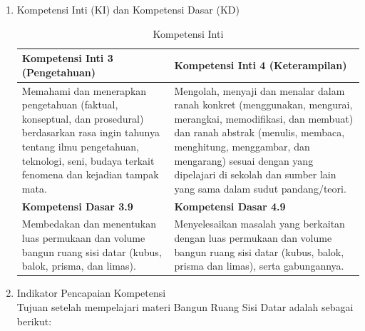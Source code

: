 \documentclass[12pt]{article}
\begin{document}
\begin{enumerate}[leftmargin=1cm, label=\arabic*.]
\begin{enumerate}[label=\textbf{\alph*.}]
        \begin{enumerate}
            \item Kompetensi Inti (KI) dan Kompetensi Dasar (KD)
            \begin{table}[h]
            \centering
            \caption{Kompetensi Inti}
            \renewcommand{\arraystretch}{1.3} %
            \begin{tabular}{|p{6cm}|p{6cm}|}
            \hline
            \textbf{Kompetensi Inti 3 (Pengetahuan)} & \textbf{Kompetensi Inti 4 (Keterampilan)} \\ 
            \hline
            Memahami dan menerapkan pengetahuan (faktual, konseptual, dan prosedural) berdasarkan rasa ingin tahunya tentang ilmu pengetahuan, teknologi, seni, budaya terkait fenomena dan kejadian tampak mata. & Mengolah, menyaji dan menalar dalam ranah konkret (menggunakan, mengurai, merangkai, memodifikasi, dan membuat) dan ranah abstrak (menulis, membaca, menghitung, menggambar, dan mengarang) sesuai dengan yang dipelajari di sekolah dan sumber lain yang sama dalam sudut pandang/teori. \\ 
            \hline
            \textbf{Kompetensi Dasar 3.9} & \textbf{Kompetensi Dasar 4.9} \\ 
            \hline
            Membedakan dan menentukan luas permukaan dan volume bangun ruang sisi datar (kubus, balok, prisma, dan limas). & Menyelesaikan masalah yang berkaitan dengan luas permukaan dan volume bangun ruang sisi datar (kubus, balok, prisma dan limas), serta gabungannya. \\ 
            \hline
            \end{tabular}
            \end{table}
            \item Indikator Pencapaian Kompetensi \\
            Tujuan setelah mempelajari materi Bangun Ruang Sisi Datar adalah sebagai berikut:


\end{enumerate}
\end{enumerate}
\end{enumerate}
\end{document}
